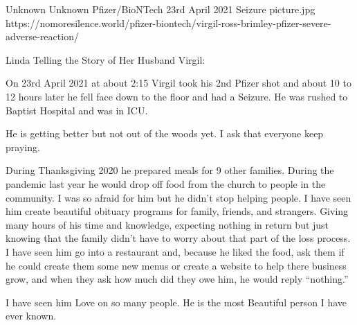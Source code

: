 {Unknown}
{Unknown}
{Pfizer/BioNTech}
{23rd April 2021}
{Seizure}
{picture.jpg}
{https://nomoresilence.world/pfizer-biontech/virgil-ross-brimley-pfizer-severe-adverse-reaction/}
{

Linda Telling the Story of Her Husband Virgil:

On 23rd April 2021 at about 2:15 Virgil took his 2nd Pfizer shot and about 10 to
12 hours later he fell face down to the floor and had a Seizure. He was rushed
to Baptist Hospital and was in ICU.

He is getting better but not out of the woods yet. I ask that everyone keep praying.

During Thanksgiving 2020 he prepared meals for 9 other families. During the
pandemic last year he would drop off food from the church to people in the
community. I was so afraid for him but he didn’t stop helping people. I have
seen him create beautiful obituary programs for family, friends, and
strangers. Giving many hours of his time and knowledge, expecting nothing in
return but just knowing that the family didn’t have to worry about that part of
the loss process. I have seen him go into a restaurant and, because he liked the
food, ask them if he could create them some new menus or create a website to
help there business grow, and when they ask how much did they owe him, he would
reply “nothing.”

I have seen him Love on so many people. He is the most Beautiful person I have
ever known.

}

